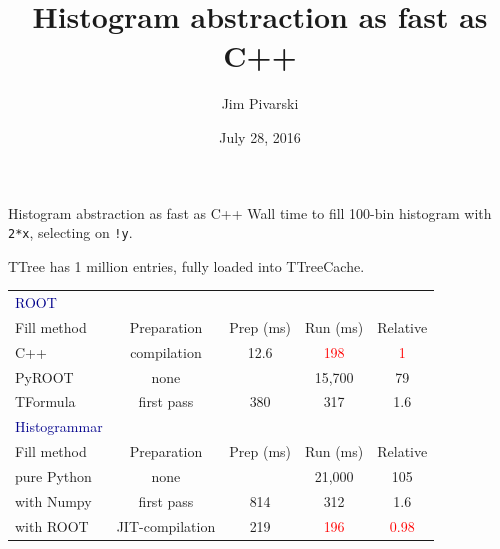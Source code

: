 \documentclass{beamer}
\title[2016-07-28-root-jit]{Histogram abstraction as fast as C++}
\author{Jim Pivarski}
\institute{Princeton University -- DIANA}
\date{July 28, 2016}
\begin{document}

\begin{frame}
  \titlepage
\end{frame}



\begin{frame}{Histogram abstraction as fast as C++}
\vspace{0.25 cm}
Wall time to fill 100-bin histogram with {\tt \small 2*x}, selecting on {\tt \small !y}.

TTree has 1 million entries, fully loaded into TTreeCache.

\renewcommand{\arraystretch}{1.2}
\vspace{0.25 cm}
\begin{tabular}{l c c c c}
\textcolor{darkblue}{ROOT} & & & & \\
Fill method & Preparation & Prep (ms) & Run (ms) & Relative \\\hline
C++ & compilation & 12.6 & \textcolor{red}{198} & \textcolor{red}{1} \\
PyROOT & none & & 15,700 & 79 \\
TFormula & first pass & 380 & 317 & 1.6\vspace{0.25 cm} \\
\textcolor{darkblue}{Histogrammar} & & & & \\
Fill method & Preparation & Prep (ms) & Run (ms) & Relative \\\hline
pure Python & none & & 21,000 & 105 \\
with Numpy & first pass & 814 & 312 & 1.6 \\
with ROOT & JIT-compilation & 219 & \textcolor{red}{196} & \textcolor{red}{0.98} \\
\end{tabular}
\end{frame}
\end{document}
